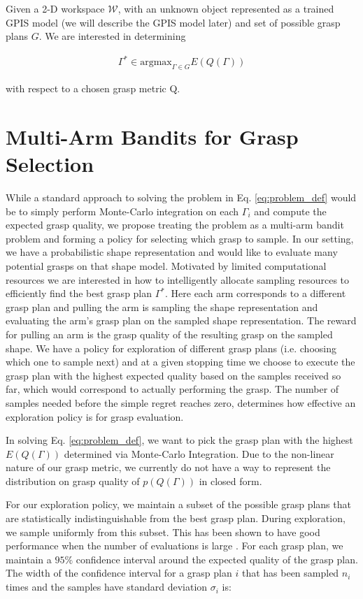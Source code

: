\documentclass[letterpaper, 10 pt, conference]{ieeeconf}  %
\begin{document}
Given a 2-D workspace $\mathcal{W}$, with an unknown object represented as a trained GPIS model (we will describe the GPIS model later) and set of possible grasp plans $G$.
We are interested in determining 

\begin{align}\label{eq:problem_def}
\Gamma^* \in \mbox{argmax}_{\Gamma \in G} E(Q(\Gamma))
\end{align}

with respect to a chosen grasp metric Q. 


\section{Multi-Arm Bandits for Grasp Selection}
While a standard approach to solving the problem in Eq. \ref{eq:problem_def} would be to simply perform Monte-Carlo integration on each $\Gamma_i$ and compute the expected grasp quality, we propose treating the problem as a multi-arm bandit problem and forming a policy for selecting which grasp to sample. 
In our setting, we have a probabilistic shape representation and would like to evaluate many potential grasps on that shape model.
Motivated by limited computational resources we are interested in how to intelligently allocate sampling resources to efficiently find the best grasp plan $\Gamma^*$.
Here each arm corresponds to a different grasp plan and pulling the arm is sampling the shape representation and evaluating the arm's grasp plan on the sampled shape representation.
The reward for pulling an arm is the grasp quality of the resulting grasp on the sampled shape.
We have a policy for exploration of different grasp plans (i.e. choosing which one to sample next) and at a given stopping time we choose to execute the grasp plan with the highest expected quality based on the samples received so far, which would correspond to actually performing the grasp.  
The number of samples needed before the simple regret reaches zero, determines how effective an exploration policy is for grasp evaluation.

In solving Eq. \ref{eq:problem_def}, we want to pick the grasp plan with the highest $E(Q(\Gamma))$ determined via Monte-Carlo Integration.
Due to the non-linear nature of our grasp metric, we currently do not have a way to represent the distribution on grasp quality of $p(Q(\Gamma))$ in closed form.

For our exploration policy, we maintain a subset of the possible grasp plans that are statistically indistinguishable from the best grasp plan.
During exploration, we sample uniformly from this subset.
This has been shown to have good performance when the number of evaluations is large \cite{bubeck2009pure}.
For each grasp plan, we maintain a $95\%$ confidence interval around the expected quality of the grasp plan.
The width of the confidence interval for a grasp plan $i$ that has been sampled $n_i$ times and the samples have standard deviation $\sigma_i$ is:
\end{document}
